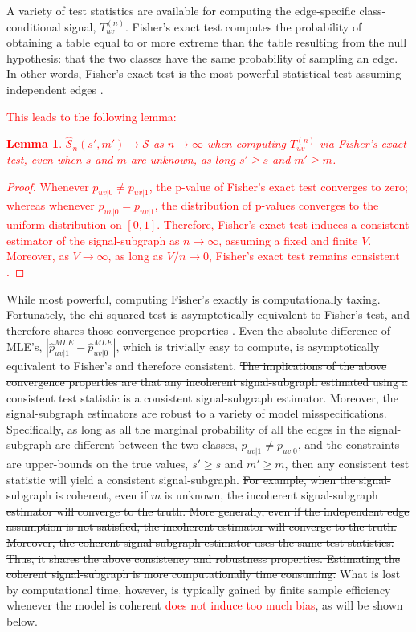 \documentclass[10pt,journal,cspaper,compsoc]{IEEEtran}
\providecommand{\tr}[1]{\textcolor{red}{#1}}
\providecommand{\mc}[1]{\mathcal{#1}}
\providecommand{\wh}[1]{\widehat{#1}}
\providecommand{\mhc}[1]{\widehat{\mathcal{#1}}}
\newcommand{\conv}{\rightarrow}
\newtheorem{Lem}{Lemma}[section]
\begin{document}
A variety of test statistics are available for computing the edge-specific class-conditional signal, $T_{uv}^{(n)}$.  Fisher's exact test computes the probability of obtaining a table equal to or more extreme than the table resulting from the null hypothesis: that the two classes have the same probability of sampling an edge.  In other words, Fisher's exact test is the most powerful statistical test assuming independent edges \cite{Rice1995}.  \tr{This leads to the following lemma:
% 
\begin{Lem}
	$\mhc{S}_n(s',m') \to \mc{S}$ as $n \to \infty$ when computing $T_{uv}^{(n)}$ via Fisher's exact test, even when $s$ and $m$ are unknown, as long $s' \geq s$ and $m' \geq m$. 
\end{Lem}
\begin{proof}
	Whenever $p_{uv|0}\neq p_{uv|1}$, the p-value of Fisher's exact test converges to zero; whereas whenever $p_{uv|0}=p_{uv|1}$, the distribution of p-values converges to the uniform distribution on $[0,1]$.  Therefore, Fisher's exact test induces a consistent estimator of the signal-subgraph as $n \conv \infty$, assuming a fixed and finite $V$.  Moreover, as $V \conv \infty$, as long as $V/n \conv 0$, Fisher's exact test remains consistent \cite{Rice1995}. 
\end{proof}
}
While most powerful, computing Fisher's exactly is computationally taxing.  Fortunately, the chi-squared test is asymptotically equivalent to Fisher's test, and therefore shares those convergence properties \cite{Rice1995}.  Even the absolute difference of MLE's, $|\wh{p}_{uv|1}^{MLE}-\wh{p}_{uv|0}^{MLE}|$, which is trivially easy to compute, is asymptotically equivalent to Fisher's \cite{Rice1995} and therefore consistent. 
% 
\sout{The implications of the above convergence properties are that any incoherent signal-subgraph estimated using a consistent test statistic is a consistent signal-subgraph estimator.}  Moreover, the signal-subgraph estimators are robust to a variety of model misspecifications.  Specifically, as long as all the marginal probability of all the edges in the signal-subgraph are different between the two classes, $p_{uv|1}\neq p_{uv|0}$,  and the constraints are upper-bounds on the true values, $s' \geq s$ and $m' \geq m$, 
then any consistent test statistic will yield a consistent signal-subgraph.  \sout{For example, when the signal-subgraph is coherent, even if $m$ is unknown, the incoherent signal-subgraph estimator will converge to the truth.  More generally, even if the independent edge assumption is not satisfied, the incoherent estimator will converge to the truth.}
% 
\sout{Moreover, the coherent signal-subgraph estimator uses the same test statistics.  Thus, it shares the above consistency and robustness properties.  Estimating the coherent signal-subgraph is more computationally time consuming.}
% 
What is lost by computational time, however, is typically gained by finite sample efficiency whenever the model  \sout{is coherent} \tr{does not induce too much bias}, as will be shown below.
\end{document}
